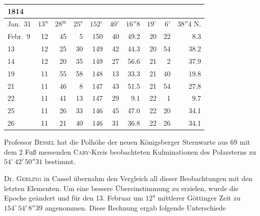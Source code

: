 \begin{center}\fontsize{9}{11}\selectfont\setlength{\tabcolsep}{3pt}\renewcommand{\arraystretch}{1.15}\begin{tabular}{l|rrr|rrr|rrr}
1814 &  &  &  \\
\hline
Jan.\ 31  & $13^{\mathrm u}$ & $28^{\mathrm m}$ & $25^{\mathrm s}$ & $152^{\circ}$ & $40'$ & $16''8$ & $19^{\circ}$ & $6'$  & $38''4$ N. \\
Febr.\ 9  & 12 & 45 & 5  & 150 & 40 & 49.2 & 20 & 22 & 8.3 \\
13        & 12 & 25 & 30 & 149 & 42 & 44.3 & 20 & 54 & 38.2 \\
14        & 12 & 20 & 35 & 149 & 27 & 56.6 & 21 & 2  & 37.9 \\
19        & 11 & 55 & 58 & 148 & 13 & 33.3 & 21 & 40 & 19.8 \\
21        & 11 & 46 & 8  & 147 & 43 & 51.5 & 21 & 54 & 27.8 \\
22        & 11 & 41 & 13 & 147 & 29 & 9.1  & 22 & 1  & 9.7  \\
25        & 11 & 26 & 33 & 146 & 45 & 47.0 & 22 & 20 & 34.1 \\
26        & 11 & 21 & 40 & 146 & 31 & 36.8 & 22 & 26 & 34.1 \\
\end{tabular}\end{center}

\par\indent Professor \textsc{Bessel} hat die Polhöhe der neuen Königsberger Sternwarte aus 69 mit dem 2 Fuß messenden \textsc{Cary}-Kreis beobachteten Kulminationen des Polarsterns zu $54^{\circ}\,42'\,50''31$ bestimmt.

\par\indent Dr. \textsc{Gerling} in Cassel übernahm den Vergleich all dieser Beobachtungen mit den letzten Elementen. Um eine bessere Übereinstimmung zu erzielen, wurde die Epoche geändert und für den 13. Februar um $12^{\mathrm u}$ mittlerer Göttinger Zeit zu $154^{\circ}\,54'\,8''39$ angenommen. Diese Rechnung ergab folgende Unterschiede

